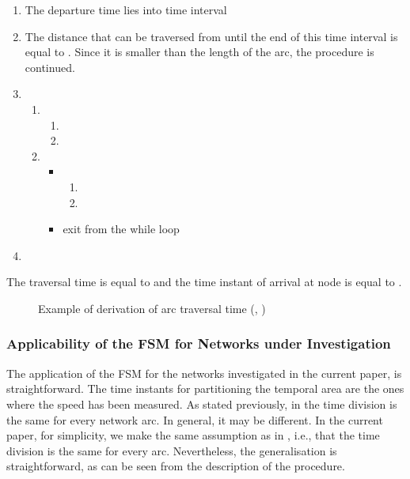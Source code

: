 \documentclass[conference]{IEEEtran}
\begin{document}
\begin{enumerate}
    \item The departure time  lies into time interval   
    \item The distance that can be traversed from  until the end of this time interval is equal to . Since it is smaller than the length of the arc, the procedure is continued.
    \item
    \begin{enumerate}
        \item 
        \begin{enumerate}
            \item 
            \item 
        \end{enumerate}       
        \item 
        \begin{itemize}
            \item 
            \begin{enumerate}
                \item 
                \item  
            \end{enumerate}
            \item  exit from the while loop
        \end{itemize}
    \end{enumerate}
    \item 
\end{enumerate}

The traversal time is equal to  and the time instant of arrival at node  is equal to .

\begin{figure}
\caption{Example of derivation of arc traversal time (, )} \label{example}
\end{figure}

\subsubsection{Applicability of the FSM for Networks under Investigation}

The application of the FSM for the networks investigated in the current paper, is straightforward. The time instants for partitioning the temporal area are the ones where the speed has been measured. As stated previously, in \cite{Sung} the time division is the same for every network arc. In general, it may be different. In the current paper, for simplicity, we make the same assumption as in \cite{Sung}, i.e., that the time division is the same for every arc. Nevertheless, the generalisation is straightforward, as can be seen from the description of the  procedure. 
\end{document}

